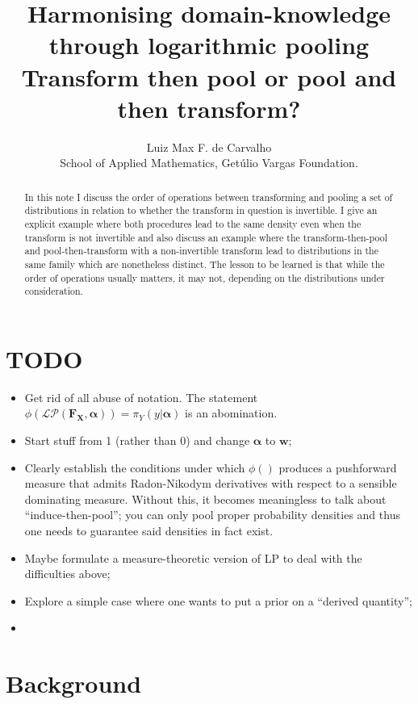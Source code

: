 \documentclass[a4paper, notitlepage, 10pt]{article}
\title{\vspace{-9ex}\centering \bf  Harmonising domain-knowledge through logarithmic pooling\\
\large Transform then pool or pool and then transform?}
\author{
Luiz Max F. de Carvalho\\
School of Applied Mathematics, Get\'ulio Vargas Foundation.
}
\begin{document}
\maketitle

\begin{abstract}
In this note I discuss the order of operations between transforming and pooling a set of distributions in relation to whether the transform in question is invertible.
I give an explicit example where both procedures lead to the same density even when the transform is not invertible and also discuss an example where the transform-then-pool and pool-then-transform with a non-invertible transform lead to distributions in the same family which are nonetheless distinct.
The lesson to be learned is that while the order of operations usually matters, it may not, depending on the distributions under consideration.

\end{abstract}

\section*{TODO}
\begin{itemize}
 \item Get rid of all abuse of notation. 
 The statement $ \phi(\mathcal{LP}(\mathbf{F_X}, \boldsymbol\alpha)) = \pi_{Y}(y | \boldsymbol\alpha)$ is an abomination.
 \item Start stuff from 1 (rather than 0) and change $\boldsymbol\alpha$ to $\boldsymbol{w}$;
 \item Clearly establish the conditions under which $\phi()$ produces a pushforward measure that admits Radon-Nikodym derivatives with respect to a sensible dominating measure. 
 Without this, it becomes meaningless to talk about ``induce-then-pool''; you can only pool proper probability densities and thus one needs to guarantee said densities in fact exist.
 \item Maybe formulate a measure-theoretic version of LP to deal with the difficulties above;
 \item Explore a simple case where one wants to put a prior on a ``derived quantity'';
 \item 
\end{itemize}


\section*{Background}
\end{document}
